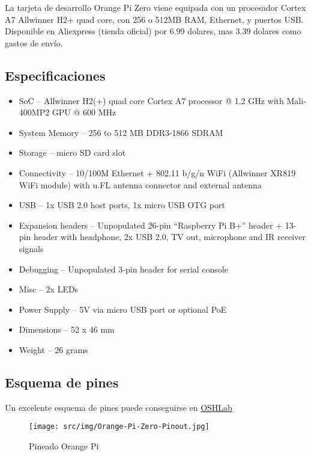 \documentclass[12pt,spanish,]{scrartcl}
\providecommand{\tightlist}{%
  \setlength{\itemsep}{0pt}\setlength{\parskip}{0pt}}
\begin{document}
La tarjeta de desarrollo Orange Pi Zero viene equipada con un procesador
Cortex A7 Allwinner H2+ quad core, con 256 o 512MB RAM, Ethernet, y
puertos USB. Disponible en Aliexpress (tienda oficial) por 6.99 dolares,
mas 3.39 dolares como gastos de envío.

\hypertarget{especificaciones}{%
\subsection{Especificaciones}\label{especificaciones}}

\begin{itemize}
\tightlist
\item
  SoC -- Allwinner H2(+) quad core Cortex A7 processor @ 1.2 GHz with
  Mali-400MP2 GPU @ 600 MHz
\item
  System Memory -- 256 to 512 MB DDR3-1866 SDRAM
\item
  Storage -- micro SD card slot
\item
  Connectivity -- 10/100M Ethernet + 802.11 b/g/n WiFi (Allwinner XR819
  WiFi module) with u.FL antenna connector and external antenna
\item
  USB -- 1x USB 2.0 host ports, 1x micro USB OTG port
\item
  Expansion headers -- Unpopulated 26-pin ``Raspberry Pi B+'' header +
  13-pin header with headphone, 2x USB 2.0, TV out, microphone and IR
  receiver signals
\item
  Debugging -- Unpopulated 3-pin header for serial console
\item
  Misc -- 2x LEDs
\item
  Power Supply -- 5V via micro USB port or optional PoE
\item
  Dimensions -- 52 x 46 mm
\item
  Weight -- 26 grams
\end{itemize}

\hypertarget{esquema-de-pines}{%
\subsection{Esquema de pines}\label{esquema-de-pines}}

Un excelente esquema de pines puede conseguirse en
\href{https://oshlab.com/orange-pi-zero-pinout/}{OSHLab}

\begin{figure}
\centering
\texttt{[image: src/img/Orange-Pi-Zero-Pinout.jpg]}
\caption{Pineado Orange Pi}
\end{figure}
\end{document}
